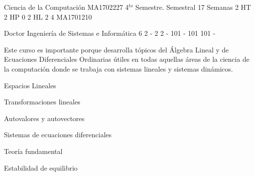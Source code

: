 \documentclass[a4paper,8pt]{article}
\begin{document}
\setNombreProfesor{}
\setGradoProfesorAbreviado{}
\sylabusHeader

\academicaTable
{Ciencia de la Computación} %
{MA1702227} %
{4$^{to}$ Semestre.} %
{Semestral} %
{17 Semanas} %
{2 HT} %
{2 HP} %
{0} %
{2 HL}  %
{2} %
{4} %
{MA1701210} %

\administrativaTable
{Doctor} %
{Ingeniería de Sistemas e Informática} %
{6} %
{2} %
{-} %
{2} %
{2} %
{-} %
{101} %
{-} %
{101} %
{101} %
{-} %


\begin{fundamentacion}
Este curso es importante porque desarrolla tópicos del Álgebra Lineal y de Ecuaciones Diferenciales Ordinarias útiles en todas aquellas áreas de la ciencia de la computación donde se trabaja con sistemas lineales y sistemas dinámicos.

\end{fundamentacion}

\begin{sumilla}
\item Espacios Lineales
\item Transformaciones lineales
\item Autovalores y autovectores
\item Sistemas de ecuaciones diferenciales
\item Teoría fundamental
\item Estabilidad de equilibrio

\end{sumilla}

\begin{competenciasAsignatura}
\item {}

\end{competenciasAsignatura}
\end{document}
